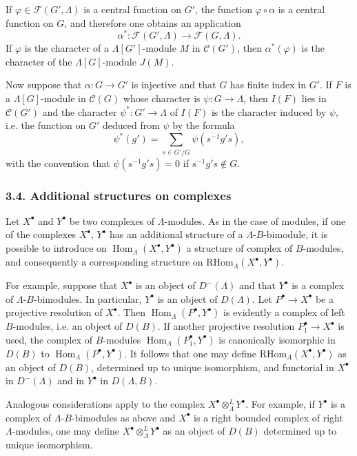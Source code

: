 \documentclass[11pt]{article}
\DeclareMathOperator{\Hom}{Hom}
\providecommand{\RHom}{\mathrm{RHom}}
\providecommand{\RHom}{\mathrm{RHom}}
\providecommand{\Hom}{\operatorname{Hom}}
\providecommand{\RHom}{\mathrm R\mathcal{H}om}
\begin{document}
If $\varphi\in\mathcal F(G',\Lambda)$ is a central function on $G'$, the function $\varphi\circ\alpha$ is a central function on $G$, and therefore one obtains an application
\[
\alpha^*: \mathcal F(G',\Lambda)\longrightarrow\mathcal F(G,\Lambda).
\]
If $\varphi$ is the character of a $\Lambda[G']$-module $M$ in $\mathcal C(G')$, then $\alpha^*(\varphi)$ is the character of the $\Lambda[G]$-module $J(M)$.

Now suppose that $\alpha:G\to G'$ is injective and that $G$ has finite index in $G'$. If $F$ is a $\Lambda[G]$-module in $\mathcal C(G)$ whose character is $\psi:G\to\Lambda$, then $I(F)$ lies in $\mathcal C(G')$ and the character $\psi^*:G'\to\Lambda$ of $I(F)$ is the character induced by $\psi$, i.e. the function on $G'$ deduced from $\psi$ by the formula
\[
\psi^*(g')=\sum_{s\in G'/G}\psi(s^{-1}g's),
\tag{3.3.1}
\]
with the convention that $\psi(s^{-1}g's)=0$ if $s^{-1}g's\notin G$.

\subsubsection*{3.4. Additional structures on complexes}

Let $X^\bullet$ and $Y^\bullet$ be two complexes of $\Lambda$-modules. As in the case of modules, if one of the complexes $X^\bullet$, $Y^\bullet$ has an additional structure of a $\Lambda$-$B$-bimodule, it is possible to introduce on $\Hom_\Lambda(X^\bullet,Y^\bullet)$ a structure of complex of $B$-modules, and consequently a corresponding structure on $\RHom_\Lambda(X^\bullet,Y^\bullet)$.

For example, suppose that $X^\bullet$ is an object of $D^-(\Lambda)$ and that $Y^\bullet$ is a complex of $\Lambda$-$B$-bimodules. In particular, $Y^\bullet$ is an object of $D(\Lambda)$. Let $P^\bullet\to X^\bullet$ be a projective resolution of $X^\bullet$. Then $\Hom_\Lambda(P^\bullet,Y^\bullet)$ is evidently a complex of left $B$-modules, i.e. an object of $D(B)$. If another projective resolution $P_1^\bullet\to X^\bullet$ is used, the complex of $B$-modules $\Hom_\Lambda(P_1^\bullet,Y^\bullet)$ is canonically isomorphic in $D(B)$ to $\Hom_\Lambda(P^\bullet,Y^\bullet)$. It follows that one may define $\RHom_\Lambda(X^\bullet,Y^\bullet)$ as an object of $D(B)$, determined up to unique isomorphism, and functorial in $X^\bullet$ in $D^-(\Lambda)$ and in $Y^\bullet$ in $D(\Lambda,B)$.

Analogous considerations apply to the complex $X^\bullet\otimes_\Lambda^L Y^\bullet$. For example, if $Y^\bullet$ is a complex of $\Lambda$-$B$-bimodules as above and $X^\bullet$ is a right bounded complex of right $\Lambda$-modules, one may define $X^\bullet\otimes_\Lambda^L Y^\bullet$ as an object of $D(B)$ determined up to unique isomorphism.
\end{document}
